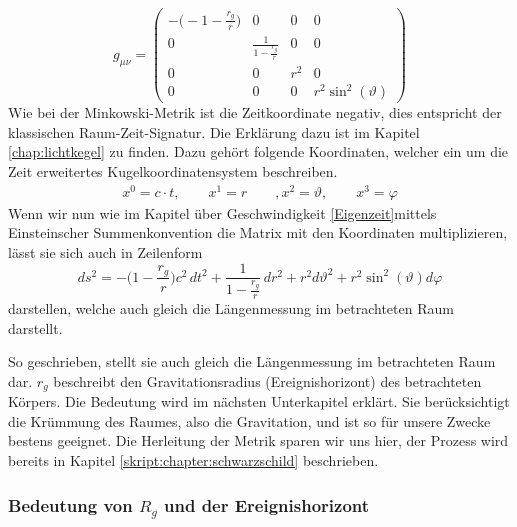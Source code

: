\begin{refsection}
	\begin{equation}
	g_{\mu\nu}=
	\begin{pmatrix}
	-\biggl(-1- \displaystyle \frac{r_{g}}{r}\biggr) & 0 & 0 & 0 \\
	0 & \frac{\displaystyle 1}{\displaystyle1-\frac{r_{g}}{r}} & 0 & 0 \\
	0 & 0 & r^{2} & 0 \\
	0 & 0 & 0 & r^{2}\sin^{2}(\vartheta)
	\end{pmatrix}
	\end{equation}
	Wie bei der Minkowski-Metrik ist die Zeitkoordinate negativ, dies entspricht der klassischen Raum-Zeit-Signatur. Die Erklärung dazu ist im Kapitel \ref{chap:lichtkegel} zu finden.
	Dazu gehört folgende Koordinaten, welcher ein um die Zeit erweitertes Kugelkoordinatensystem beschreiben.
	\begin{align*}
	x^{0}=c \cdot t, \qquad
	x^{1}=r \qquad,
	x^{2}=\vartheta, \qquad
	x^{3}=\varphi
	\end{align*}
	Wenn wir nun wie im Kapitel über Geschwindigkeit \ref{Eigenzeit}mittels Einsteinscher Summenkonvention die Matrix mit den Koordinaten multiplizieren, lässt sie sich auch in Zeilenform
	\begin{equation}
	ds^2
	=
	-\biggl(1-\frac{r_g}r\biggr)c^2\,dt^2
	+
	\frac{1}{\displaystyle 1-\frac{r_g}r}\,dr^2 
	+
	r^2d\vartheta^2 
	+ 
	r^2\sin^2(\vartheta)d\varphi
	\end{equation}
	darstellen, welche auch gleich die Längenmessung im betrachteten Raum darstellt.
	
	So geschrieben, stellt sie auch gleich die Längenmessung im betrachteten Raum dar.
	$r_g$ beschreibt den Gravitationsradius (Ereignishorizont) des betrachteten Körpers. Die Bedeutung wird im nächsten Unterkapitel erklärt.
	Sie berücksichtigt die Krümmung des Raumes, also die Gravitation, und ist so für unsere Zwecke bestens geeignet. 
	Die Herleitung der Metrik sparen wir uns hier, der Prozess wird bereits in Kapitel \ref{skript:chapter:schwarzschild} beschrieben.
	
	\subsubsection{Bedeutung von $R_{g}$ und der Ereignishorizont}
	

\end{refsection}
